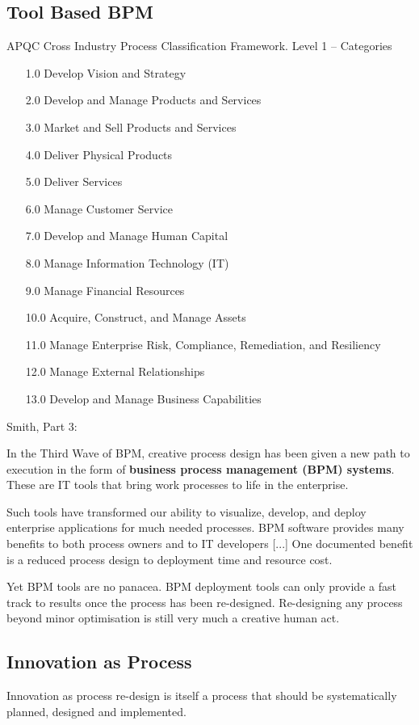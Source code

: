 \documentclass[11pt,a4paper]{article}
\begin{document}
\subsection{Tool Based BPM}
APQC Cross Industry Process Classification Framework. Level 1 -- Categories
\cite{APQC-1,APQC-2,APQC-3}
\begin{itemize}
\item[1.0] Develop Vision and Strategy
\item[2.0] Develop and Manage Products and Services
\item[3.0] Market and Sell Products and Services 
\item[4.0] Deliver Physical Products 
\item[5.0] Deliver Services 
\item[6.0] Manage Customer Service 
\item[7.0] Develop and Manage Human Capital 
\item[8.0] Manage Information Technology (IT) 
\item[9.0] Manage Financial Resources 
\item[10.0] Acquire, Construct, and Manage Assets 
\item[11.0] Manage Enterprise Risk, Compliance, Remediation, and Resiliency 
\item[12.0] Manage External Relationships 
\item[13.0] Develop and Manage Business Capabilities
\end{itemize}

Smith, Part 3:

In the Third Wave of BPM, creative process design has been given a new path to
execution in the form of \textbf{business process management (BPM)
  systems}. These are IT tools that bring work processes to life in the
enterprise.

Such tools have transformed our ability to visualize, develop, and deploy
enterprise applications for much needed processes. BPM software provides many
benefits to both process owners and to IT developers [...] One documented
benefit is a reduced process design to deployment time and resource cost.

Yet BPM tools are no panacea. BPM deployment tools can only provide a fast
track to results once the process has been re-designed. Re-designing any
process beyond minor optimisation is still very much a creative human act.

\subsection{Innovation as Process}
Innovation as process re-design is itself a process that should be
systematically planned, designed and implemented.
\end{document}

